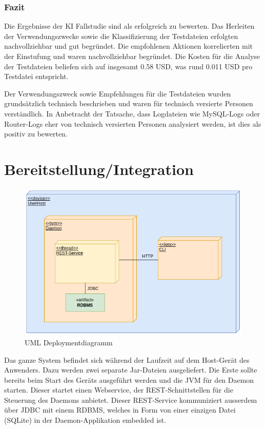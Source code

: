 \documentclass[a4paper,12pt]{report}
\begin{document}
    \subsection{Fazit}\label{subsec:diskussion}
    Die Ergebnisse der KI Fallstudie sind als erfolgreich zu bewerten.
    Das Herleiten der Verwendungszwecke sowie die Klassifizierung der Testdateien erfolgten nachvollziehbar und gut begründet.
    Die empfohlenen Aktionen korrelierten mit der Einstufung und waren nachvollziehbar begründet.
    Die Kosten für die Analyse der Testdateien beliefen sich auf insgesamt 0.58 USD, was rund 0.011 USD pro Testdatei entspricht.

    Der Verwendungszweck sowie Empfehlungen für die Testdateien wurden grundsätzlich technisch beschrieben und waren für technisch versierte Personen verständlich.
    In Anbetracht der Tatsache, dass Logdateien wie MySQL-Logs oder Router-Logs eher von technisch versierten Personen analysiert werden, ist dies als positiv zu bewerten.

    \clearpage
    \chapter{Bereitstellung/Integration}

    \begin{figure}[h]
        \centering
        \includegraphics[width=1\textwidth]{assets/DeplDiagram}
        \caption{UML Deploymentdiagramm}
        \label{fig:depl-diag}
    \end{figure}

    Das ganze System befindet sich während der Laufzeit auf dem Host-Gerät des Anwenders.
    Dazu werden zwei separate Jar-Dateien ausgeliefert.
    Die Erste sollte bereits beim Start des Geräts ausgeführt werden und die JVM für den Daemon starten.
    Dieser startet einen Webservice, der REST-Schnittstellen für die Steuerung des Daemons anbietet.
    Dieser REST-Service kommuniziert ausserdem über JDBC mit einem RDBMS, welches in Form von einer einzigen Datei (SQLite)
    in der Daemon-Applikation embedded ist.
\end{document}
